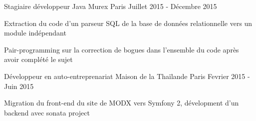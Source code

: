 \begin{cventries}
\cventry
{Stagiaire développeur Java}
{Murex}
{Paris}
{Juillet 2015 - Décembre 2015}
{
	\begin{cvitems}
	\item{Extraction du code d'un parseur SQL de la base de données relationnelle vers un module indépendant}
	\item{Pair-programming sur la correction de bogues dans l'ensemble du code après avoir complété le sujet}
	\end{cvitems}
}

\cventry
{Développeur en auto-entreprenariat}
{Maison de la Thaïlande}
{Paris}
{Fevrier 2015 - Juin 2015}
{
	\begin{cvitems}
	\item{Migration du front-end du site de MODX vers Symfony 2, dévelopment d'un backend avec sonata project}
	\end{cvitems}
}


\end{cventries}